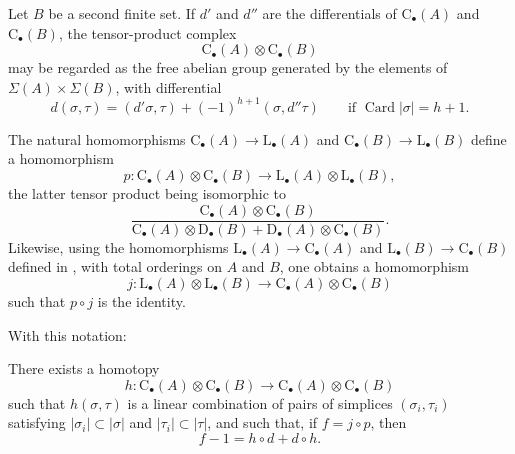 \begin{env}[11.8.2]
\label{0.11.8.2}
Let $B$ be a second finite set.
If $d'$ and $d''$ are the differentials of
$\mathrm{C}_\bullet(A)$ and $\mathrm{C}_\bullet(B)$, the tensor-product
complex
\[
  \mathrm{C}_\bullet(A)\otimes\mathrm{C}_\bullet(B)
\]
may be regarded as the free abelian group generated by the elements of
$\Sigma(A)\times\Sigma(B)$, with differential
\[
  d(\sigma,\tau)
  =
  (d'\sigma,\tau)+(-1)^{h+1}(\sigma,d''\tau)
  \qquad\text{if }\operatorname{Card}|\sigma|=h+1.
\]

The natural homomorphisms
$\mathrm{C}_\bullet(A)\to\mathrm{L}_\bullet(A)$ and
$\mathrm{C}_\bullet(B)\to\mathrm{L}_\bullet(B)$ define a homomorphism
\[
  p:
  \mathrm{C}_\bullet(A)\otimes\mathrm{C}_\bullet(B)
  \longrightarrow
  \mathrm{L}_\bullet(A)\otimes\mathrm{L}_\bullet(B),
\]
the latter tensor product being isomorphic to
\[
  \frac{\mathrm{C}_\bullet(A)\otimes\mathrm{C}_\bullet(B)}
  {\mathrm{C}_\bullet(A)\otimes\mathrm{D}_\bullet(B)
   +\mathrm{D}_\bullet(A)\otimes\mathrm{C}_\bullet(B)}.
\]
Likewise, using the homomorphisms
$\mathrm{L}_\bullet(A)\to\mathrm{C}_\bullet(A)$ and
$\mathrm{L}_\bullet(B)\to\mathrm{C}_\bullet(B)$ defined in
, with total orderings on $A$ and $B$, one obtains a
homomorphism
\[
  j:
  \mathrm{L}_\bullet(A)\otimes\mathrm{L}_\bullet(B)
  \longrightarrow
  \mathrm{C}_\bullet(A)\otimes\mathrm{C}_\bullet(B)
\]
such that $p\circ j$ is the identity.
\end{env}

With this notation:
\begin{proposition}[11.8.3]
\label{0.11.8.3}
There exists a homotopy
\[
  h:
  \mathrm{C}_\bullet(A)\otimes\mathrm{C}_\bullet(B)
  \longrightarrow
  \mathrm{C}_\bullet(A)\otimes\mathrm{C}_\bullet(B)
\]
such that $h(\sigma,\tau)$ is a linear combination of pairs of simplices
$(\sigma_i,\tau_i)$ satisfying
$|\sigma_i|\subset|\sigma|$ and $|\tau_i|\subset|\tau|$, and such that,
if $f=j\circ p$, then
\[
  f-1=h\circ d+d\circ h.
  \tag{11.8.3.1}\label{0.11.8.3.1}
\]
\end{proposition}

